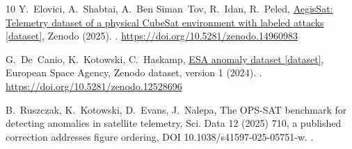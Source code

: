 \documentclass[preprint,12pt]{elsarticle}
\begin{document}
\begin{thebibliography}{10}
Y.~Elovici, A.~Shabtai, A.~Ben Siman~Tov, R.~Idan, R.~Peled,
  \href{https://doi.org/10.5281/zenodo.14960983}{{AegisSat}: Telemetry dataset
  of a physical {CubeSat} environment with labeled attacks {[dataset]}}, Zenodo
  (2025).
\newblock \href {https://doi.org/10.5281/zenodo.14960983}
  {}.
\newline\urlprefix\url{https://doi.org/10.5281/zenodo.14960983}

G.~De~Canio, K.~Kotowski, C.~Haskamp,
  \href{https://doi.org/10.5281/zenodo.12528696}{{ESA} anomaly dataset
  {[dataset]}}, European Space Agency, Zenodo dataset, version 1 (2024).
\newblock \href {https://doi.org/10.5281/zenodo.12528696}
  {}.
\newline\urlprefix\url{https://doi.org/10.5281/zenodo.12528696}

B.~Ruszczak, K.~Kotowski, D.~Evans, J.~Nalepa, The {OPS-SAT} benchmark for
  detecting anomalies in satellite telemetry, Sci. Data 12 (2025) 710, a
  published correction addresses figure ordering, DOI
  10.1038/s41597-025-05751-w.
\newblock \href {https://doi.org/10.1038/s41597-025-05035-3}
  {}.

\end{thebibliography}
\end{document}
